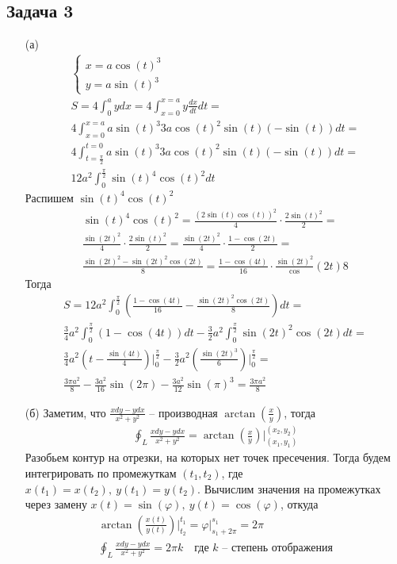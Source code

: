 \subsection*{Задача 3}
\begin{enumerate}
\item[(а)]
	\begin{gather*}
	\begin{cases}
	x = a \cos(t)^3\\
	y = a \sin(t)^3
	\end{cases}\\
	S = 
	4\int_{0}^{a} y dx =
	4\int_{x = 0}^{x = a} y \frac{dx}{dt} dt =\\
	4\int_{x = 0}^{x = a} a\sin(t)^3 3a\cos(t)^2 \sin(t) (-\sin(t)) dt =\\
	4\int_{t = \frac{\pi}{2}}^{t = 0} a\sin(t)^3 3a\cos(t)^2 \sin(t) (-\sin(t)) dt =\\
	12a^2 \int_{0}^{\frac{\pi}{2}} \sin(t)^4 \cos(t)^2 dt
	\end{gather*}
	Распишем $\sin(t)^4\cos(t)^2$
	\begin{gather*}
	\sin(t)^4\cos(t)^2 = 
	\frac{(2\sin(t)\cos(t))^2}{4} \cdot \frac{2\sin(t)^2}{2} =\\
	\frac{\sin(2t)^2}{4} \cdot \frac{2\sin(t)^2}{2} =
	\frac{\sin(2t)^2}{4} \cdot \frac{1 - \cos(2t)}{2} =\\
	\frac{\sin(2t)^2 - \sin(2t)^2\cos(2t)}{8} =
	\frac{1 - \cos(4t)}{16} \cdot \frac{\sin(2t)^2} \cos(2t){8}
	\end{gather*}
	Тогда
	\begin{gather*}
	S = 
	12a^2 \int_{0}^{\frac{\pi}{2}} \left(\frac{1 - \cos(4t)}{16} - \frac{\sin(2t)^2 \cos(2t)}{8}\right) dt =\\
	\frac{3}{4}a^2 \int_{0}^{\frac{\pi}{2}}(1-\cos(4t))dt - \frac{3}{2}a^2 \int_{0}^{\frac{\pi}{2}} \sin(2t)^2 \cos(2t) dt =\\
	\frac{3}{4}a^2 \left(t - \frac{\sin(4t)}{4}\right)\bigg|_{0}^{\frac{\pi}{2}} - \frac{3}{2}a^2 \left(\frac{\sin(2t)^3}{6}\right) \bigg|_{0}^{\frac{\pi}{2}} =\\
	\frac{3\pi a^2}{8} - \frac{3a^2}{16}\sin(2\pi) - \frac{3a^2}{12}\sin(\pi)^3 =
	\frac{3\pi a^2}{8}
	\end{gather*}
\item[(б)]
	Заметим, что $\frac{xdy - ydx}{x^2 + y^2}$ -- производная $\arctan(\frac{x}{y})$, тогда
	\begin{gather*}
	\oint_L \frac{xdy - ydx}{x^2 + y^2} = \arctan\left(\frac{x}{y}\right)\bigg|_{(x_1,y_1)}^{(x_2,y_2)}
	\end{gather*}
	Разобьем контур на отрезки, на которых нет точек пресечения. Тогда будем интегрировать по промежуткам $(t_1, t_2)$, где $x(t_1) = x(t_2),\ y(t_1) = y(t_2)$. Вычислим значения на промежутках через замену $x(t) = \sin(\varphi),\ y(t) = \cos(\varphi)$, откуда
	\begin{gather*}
	\arctan\left(\frac{x(t)}{y(t)}\right) \bigg|_{t_2}^{t_1} = \varphi|_{s_1 + 2\pi}^{s_1} = 2\pi\\
	\oint_L \frac{xdy - ydx}{x^2 + y^2} = 2\pi k\quad \text{где } k \text{ -- степень отображения}
	\end{gather*}
	
	
	
\end{enumerate}
